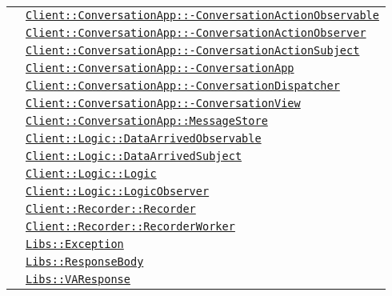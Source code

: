 \begin{longtable}{|>{\centering}m{3cm}|m{10cm}<{\centering}|}
& \hyperref[Client::ConversationApp::ConversationActionObservable]{\texttt{Client::ConversationApp::-\linebreak ConversationActionObservable}}\\
& \hyperref[Client::ConversationApp::ConversationActionObserver]{\texttt{Client::ConversationApp::-\linebreak ConversationActionObserver}}\\
& \hyperref[Client::ConversationApp::ConversationActionSubject]{\texttt{Client::ConversationApp::-\linebreak ConversationActionSubject}}\\
& \hyperref[Client::ConversationApp::ConversationApp]{\texttt{Client::ConversationApp::-\linebreak ConversationApp}}\\
& \hyperref[Client::ConversationApp::ConversationDispatcher]{\texttt{Client::ConversationApp::-\linebreak ConversationDispatcher}}\\
& \hyperref[Client::ConversationApp::ConversationView]{\texttt{Client::ConversationApp::-\linebreak ConversationView}}\\
& \hyperref[Client::ConversationApp::MessageStore]{\texttt{Client::ConversationApp::MessageStore}}\\
& \hyperref[Client::Logic::DataArrivedObservable]{\texttt{Client::Logic::DataArrivedObservable}}\\
& \hyperref[Client::Logic::DataArrivedSubject]{\texttt{Client::Logic::DataArrivedSubject}}\\
& \hyperref[Client::Logic::Logic]{\texttt{Client::Logic::Logic}}\\
& \hyperref[Client::Logic::LogicObserver]{\texttt{Client::Logic::LogicObserver}}\\
& \hyperref[Client::Recorder::Recorder]{\texttt{Client::Recorder::Recorder}}\\
& \hyperref[Client::Recorder::RecorderWorker]{\texttt{Client::Recorder::RecorderWorker}}\\
& \hyperref[Libs::Exception]{\texttt{Libs::Exception}}\\
& \hyperref[Libs::ResponseBody]{\texttt{Libs::ResponseBody}}\\
& \hyperref[Libs::VAResponse]{\texttt{Libs::VAResponse}}\\ \hline


\end{longtable}
